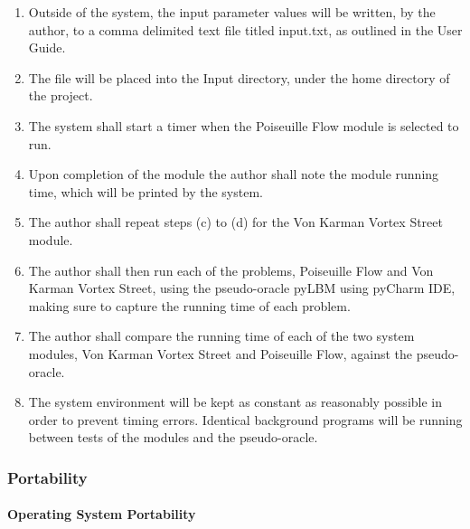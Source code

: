 \documentclass[12pt, titlepage]{article}
\begin{document}
\begin{enumerate}
\begin{enumerate}
\item Outside of the system, the input parameter values will be written, by the
author, to a comma delimited text file titled input.txt, as outlined in the User
Guide.
\item The file will be placed into the Input directory, under the home directory
of the project.
\item The system shall start a timer when the Poiseuille Flow module is selected to run.
\item Upon completion of the module the author shall note the module running
time, which will be printed by the system.
\item The author shall repeat steps (c) to (d) for the Von Karman Vortex Street
module.
\item The author shall then run each of the problems, Poiseuille Flow and Von
Karman Vortex Street, using the pseudo-oracle pyLBM using pyCharm IDE, making
sure to capture the running time of each problem.
\item The author shall compare the running time of each of the two system
modules, Von Karman Vortex Street and Poiseuille Flow, against the
pseudo-oracle.
\item The system environment will be kept as constant as reasonably possible in order to prevent timing errors. Identical background programs will be running between tests of the modules and the pseudo-oracle.
\end{enumerate}

\end{enumerate}


\subsubsection{Portability}
		
\paragraph{Operating System Portability}
\end{document}
